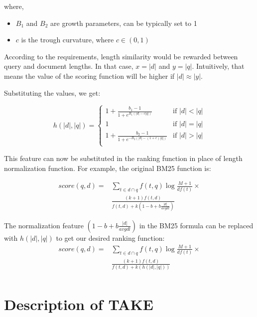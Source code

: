 where,

\begin{itemize}
	\item $B_1$ and $B_2$ are growth parameters, can be typically set to 1
	\item $c$ is the trough curvature, where $c \in (0, 1)$
\end{itemize}

According to the requirements, length similarity would be rewarded between query and document lengths. In that case, $x = |d|$ and $y = |q|$. Intuitively, that means the value of the scoring function will be higher if $|d| \approx |y|$.

Substituting the values, we get:

\begin{equation}
h(|d|, |q|) = 
\begin{cases}
1 + \frac{b_1 - 1}{1 + e^{B_1(|d| - c|q|)}}       & \text{if } |d| < |q|\\
1 &  \text{if } |d| = |q|\\
1 + \frac{b_2 - 1}{1 + e^{-B_2(|d| - (1 + c)|q|)}}  &  \text{if } |d| > |q|\\
\end{cases}
\end{equation}

This feature can now be substituted in the ranking function in place of length normalization function. For example, the original BM25 function is:

\begin{align*}
score(q, d) = & \sum_{t \in d \cap q} f(t, q) \log \frac{M + 1}{df(t)} \times \\
& \frac{ (k + 1) f (t, d) }{f(t, d) + k \left( 1 - b + b \frac{|d|}{avgdl} \right)} 
\end{align*}

The normalization feature $\left( 1 - b + b \frac{|d|}{avgdl} \right)$ in the BM25 formula can be replaced with $h(|d|, |q|)$ to get our desired ranking function:
\begin{equation}
\label{heuris}
\begin{aligned}
score(q, d) = & \sum_{t \in d \cap q} f(t, q) \log \frac{M + 1}{df(t)} \times \\
& \frac{ (k + 1) f (t, d) }{f(t, d) + k \left( h(|d|, |q|) \right)}  \\
\end{aligned}
\end{equation}

\section{Description of TAKE}

